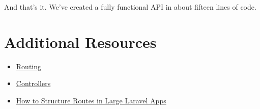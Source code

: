 \hr

And that's it. We've created a fully functional API in about fifteen lines of code.


\section{Additional Resources}

\begin{itemize}[leftmargin=*]
    \item \href{https://laravel.com/docs/master/routing}{Routing}
    \item \href{http://laravel.com/docs/master/controllers}{Controllers}
    \item \href{https://laraveldaily.com/how-to-structure-routes-in-large-laravel-projects/}{How to Structure Routes in Large Laravel Apps}
\end{itemize}
